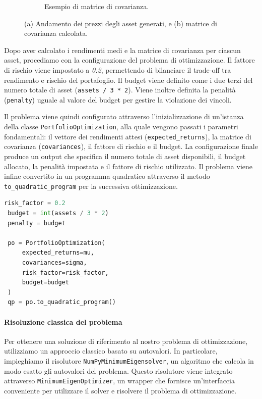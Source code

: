 \begin{figure}[h!]
\begin{subfigure}{0.45\textwidth}
        \caption{Esempio di matrice di covarianza.\footnotemark}
        \label{fig:matriceCovarianza}
    \end{subfigure}
    \caption{(a) Andamento dei prezzi degli asset generati, e (b) matrice di covarianza calcolata.}
\end{figure}


Dopo aver calcolato i rendimenti medi e la matrice di covarianza per ciascun 
asset, procediamo con la configurazione del problema di ottimizzazione. 
Il fattore di rischio viene impostato a \textit{0.2}, permettendo di bilanciare il 
trade-off tra rendimento e rischio del portafoglio. Il budget viene definito come 
i due terzi del numero totale di asset (\texttt{assets / 3 * 2}). Viene inoltre 
definita la penalità (\texttt{penalty}) uguale al valore del budget per gestire la 
violazione dei vincoli.

Il problema viene quindi configurato attraverso l'inizializzazione di 
un'istanza della classe \texttt{PortfolioOptimization}, alla quale vengono 
passati i parametri fondamentali: il vettore dei rendimenti attesi 
(\texttt{expected\_returns}), la matrice di covarianza (\texttt{covariances}), 
il fattore di rischio e il budget. La configurazione finale produce 
un output che specifica il numero totale di asset disponibili, 
il budget allocato, la penalità impostata e il fattore di rischio 
utilizzato. Il problema viene infine convertito in un programma 
quadratico attraverso il metodo \texttt{to\_quadratic\_program} per la 
successiva ottimizzazione.

\begin{lstlisting}[language=python, caption={Configurazione del problema di ottimizzazione del portafoglio.}]
 risk_factor = 0.2
 budget = int(assets / 3 * 2)
 penalty = budget

 po = PortfolioOptimization(
     expected_returns=mu, 
     covariances=sigma, 
     risk_factor=risk_factor, 
     budget=budget
 )
 qp = po.to_quadratic_program()
\end{lstlisting}

\paragraph{Risoluzione classica del problema}
Per ottenere una soluzione di riferimento al nostro problema di ottimizzazione, 
utilizziamo un approccio classico basato su autovalori. In particolare, 
impieghiamo il risolutore \texttt{NumPyMinimumEigensolver}, un algoritmo 
che calcola in modo esatto gli autovalori del problema. Questo risolutore 
viene integrato attraverso \texttt{MinimumEigenOptimizer}, un wrapper  
che fornisce un'interfaccia conveniente per utilizzare il solver e
risolvere il problema di ottimizzazione.

